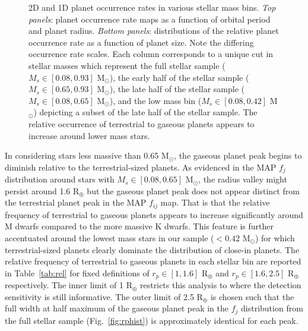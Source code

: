 \documentclass[twocolumn]{emulateapj}
\begin{document}
\begin{figure}
  \centering
  \caption{2D and 1D planet occurrence rates in various stellar mass bins. \emph{Top panels}: planet occurrence
    rate maps as a function of orbital period and planet radius. \emph{Bottom panels}: distributions of the relative
    planet occurrence rate as a function of planet size. Note the differing occurrence rate scales.
    Each column corresponds to a unique cut in stellar masses
    which represent the full stellar sample ($M_s \in [0.08,0.93]$ M$_{\odot}$), the early half of the stellar sample
    ($M_s \in [0.65,0.93]$ M$_{\odot}$), the late half of the stellar sample ($M_s \in [0.08,0.65]$ M$_{\odot}$),
    and the low mass bin ($M_s \in [0.08,0.42]$ M$_{\odot}$) depicting a subset of the late half of the stellar sample.
    The relative occurrence of terrestrial to gaseous planets appears to increase around lower mass stars.}
  \label{fig:rphistcomp}
\end{figure}

In considering stars less massive than 0.65 M$_{\odot}$, the gaseous planet peak begins to diminish relative
to the terrestrial-sized planets. As evidenced in the MAP $f_j$ distribution around stars with
$M_s \in [0.08,0.65]$ M$_{\odot}$, the radius valley might persist around 1.6 R$_{\oplus}$ but the gaseous planet
peak does not appear distinct from the terrestrial planet peak in the MAP $f_{ij}$ map. That is that the relative
frequency of terrestrial to gaseous planets appears to increase significantly around M dwarfs compared to the more
massive K dwarfs. This feature is further accentuated around the lowest mass stars in our sample ($<0.42$
M$_{\odot}$) for which terrestrial-sized planets clearly dominate the distribution of close-in planets. The relative
frequency of terrestrial to gaseous planets in each stellar bin are reported in Table~\ref{tab:rel}
for fixed definitions of $r_p \in [1,1.6]$ R$_{\oplus}$ and $r_p \in [1.6,2.5]$ R$_{\oplus}$ respectively. The inner
limit of 1 R$_{\oplus}$ restricts this analysis to where the detection sensitivity is still informative. The outer
limit of 2.5 R$_{\oplus}$ is chosen such that the full width at half maximum of the gaseous planet peak in the
$f_j$ distribution from the full stellar sample (Fig.~\ref{fig:rphist}) is approximately identical for each peak.
\end{document}

